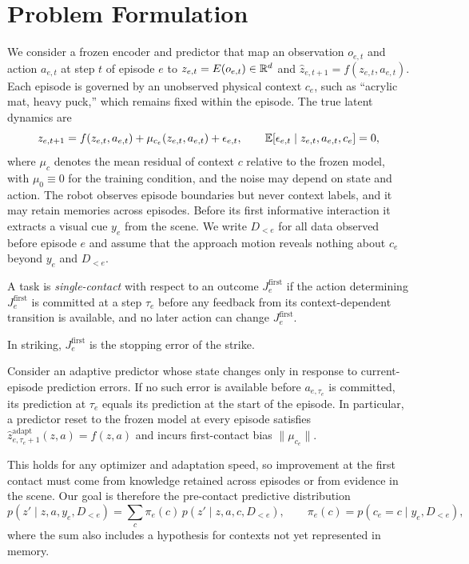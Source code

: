 \section{Problem Formulation}\label{sec:problem}



We consider a frozen encoder and predictor that map an observation $o_{e,t}$ and action $a_{e,t}$ at step $t$ of episode $e$ to $z_{e,t}=E(o_{e,t})\in\mathbb{R}^d$ and $\hat z_{e,t+1}=f(z_{e,t},a_{e,t})$. Each episode is governed by an unobserved physical context $c_e$, such as ``acrylic mat, heavy puck,'' which remains fixed within the episode. The true latent dynamics are
\begin{equation}\label{eq:dynamics}
  z_{e,t+1}=f(z_{e,t},a_{e,t})+\mu_{c_e}(z_{e,t},a_{e,t})+\epsilon_{e,t},\qquad \mathbb{E}[\epsilon_{e,t}\mid z_{e,t},a_{e,t},c_e]=0,
\end{equation}
where $\mu_c$ denotes the mean residual of context $c$ relative to the frozen model, with $\mu_0\equiv0$ for the training condition, and the noise may depend on state and action. The robot observes episode boundaries but never context labels, and it may retain memories across episodes. Before its first informative interaction it extracts a visual cue $y_e$ from the scene. We write $D_{<e}$ for all data observed before episode $e$ and assume that the approach motion reveals nothing about $c_e$ beyond $y_e$ and $D_{<e}$.

\begin{definition}\label{def:single}
A task is \emph{single-contact} with respect to an outcome $J^{\mathrm{first}}_e$ if the action determining $J^{\mathrm{first}}_e$ is committed at a step $\tau_e$ before any feedback from its context-dependent transition is available, and no later action can change $J^{\mathrm{first}}_e$.
\end{definition}

In striking, $J^{\mathrm{first}}_e$ is the stopping error of the strike.

\begin{observation}\label{obs:first}
Consider an adaptive predictor whose state changes only in response to current-episode prediction errors. If no such error is available before $a_{e,\tau_e}$ is committed, its prediction at $\tau_e$ equals its prediction at the start of the episode. In particular, a predictor reset to the frozen model at every episode satisfies $\hat z^{\mathrm{adapt}}_{e,\tau_e+1}(z,a)=f(z,a)$ and incurs first-contact bias $\|\mu_{c_e}\|$.
\end{observation}

This holds for any optimizer and adaptation speed, so improvement at the first contact must come from knowledge retained across episodes or from evidence in the scene. Our goal is therefore the pre-contact predictive distribution
\begin{equation}\label{eq:mixture}
  p(z'\mid z,a,y_e,D_{<e})=\textstyle\sum_{c}\pi_e(c)\,p(z'\mid z,a,c,D_{<e}),\qquad \pi_e(c)=p(c_e=c\mid y_e,D_{<e}),
\end{equation}
where the sum also includes a hypothesis for contexts not yet represented in memory.
